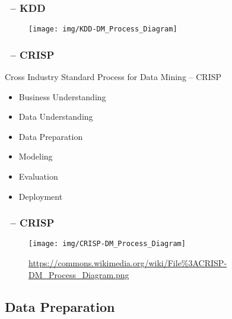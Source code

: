 \begin{frame}
    \frametitle{\insertsubsection \ -- KDD}
    \begin{figure}[H]
        \centering
        \texttt{[image: img/KDD-DM\_Process\_Diagram]}
        \caption{\cite{kdd96}}\label{fig:kdd}
    \end{figure}
\end{frame}

\begin{frame}
    \frametitle{\insertsubsection \ -- CRISP}
    \begin{block}{Cross Industry Standard Process for Data Mining -- CRISP \cite{crisp2000}}
        \vspace{0.5em}
        \begin{itemize}
            \setlength\itemsep{1em}
            \item Business Understanding
            \item Data Understanding
            \item Data Preparation
            \item Modeling
            \item Evaluation
            \item Deployment
        \end{itemize}
    \end{block}
\end{frame}

\begin{frame}
    \frametitle{\insertsubsection \ -- CRISP}
    \begin{figure}[H]
        \centering
        \texttt{[image: img/CRISP-DM\_Process\_Diagram]}
        \caption{\url{https://commons.wikimedia.org/wiki/File\%3ACRISP-DM\_Process\_Diagram.png}\label{fig:crisp}}
    \end{figure}
\end{frame}

\subsection{Data Preparation}

